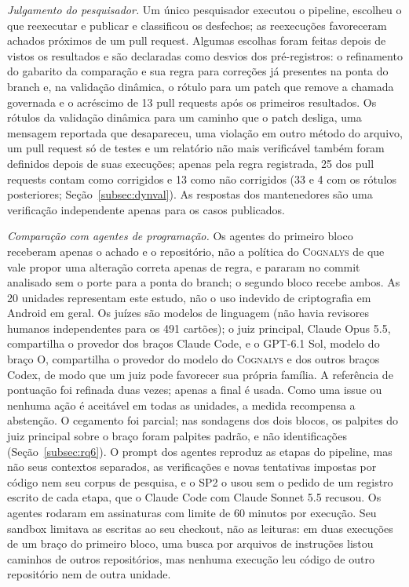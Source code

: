 \documentclass[conference]{IEEEtran}
\newcommand{\system}{\textsc{Cognalys}}
\begin{document}
\emph{Julgamento do pesquisador.} Um único pesquisador executou o pipeline, escolheu o que
reexecutar e publicar e classificou os desfechos; as reexecuções favoreceram achados
próximos de um pull request. Algumas escolhas foram feitas depois de vistos os resultados
e são declaradas como desvios dos pré-registros: o refinamento do gabarito da comparação
e sua regra para correções já presentes na ponta do branch e, na validação
dinâmica, o rótulo para um patch que remove a chamada governada e o acréscimo
de 13 pull requests após os primeiros resultados. Os rótulos da validação dinâmica para um
caminho que o patch desliga, uma mensagem reportada que desapareceu, uma violação em
outro método do arquivo, um pull request só de testes e um relatório não mais
verificável também foram definidos depois de suas execuções; apenas pela regra registrada, 25 dos pull requests
contam como corrigidos e 13 como não corrigidos (33 e 4 com os rótulos posteriores;
Seção~\ref{subsec:dynval}). As respostas dos mantenedores são uma
verificação independente apenas para os casos publicados.

\emph{Comparação com agentes de programação.} Os agentes do primeiro bloco receberam apenas
o achado e o repositório, não a política do \system{} de que vale propor uma alteração
correta apenas de regra, e pararam no commit analisado
sem o porte para a ponta do branch; o segundo bloco recebe ambos. As 20
unidades representam este estudo, não o uso indevido de criptografia em Android em geral.
Os juízes são modelos de linguagem (não havia revisores humanos independentes para os
491 cartões); o juiz principal, Claude Opus 5.5, compartilha o provedor dos braços
Claude Code, e o GPT-6.1 Sol, modelo do braço O, compartilha o provedor do modelo do
\system{} e dos outros braços Codex, de modo que um juiz pode favorecer sua própria
família. A referência de pontuação foi refinada duas vezes; apenas a final é usada. Como uma issue ou nenhuma ação é
aceitável em todas as unidades, a medida recompensa a abstenção. O cegamento foi
parcial; nas sondagens dos dois blocos, os palpites do juiz principal sobre o braço
foram palpites padrão, e não identificações (Seção~\ref{subsec:rq6}). O prompt dos
agentes reproduz as etapas do pipeline, mas não seus contextos separados, as
verificações e novas tentativas impostas por código nem seu corpus de pesquisa, e o SP2
o usou sem o pedido de um registro escrito de cada etapa, que o Claude Code com Claude
Sonnet 5.5 recusou. Os agentes rodaram em assinaturas com limite de 60 minutos por
execução. Seu sandbox limitava as escritas ao seu checkout, não as leituras: em duas
execuções de um braço do primeiro bloco, uma busca por arquivos de instruções listou
caminhos de outros repositórios, mas nenhuma execução leu código de outro repositório
nem de outra unidade.
\end{document}
